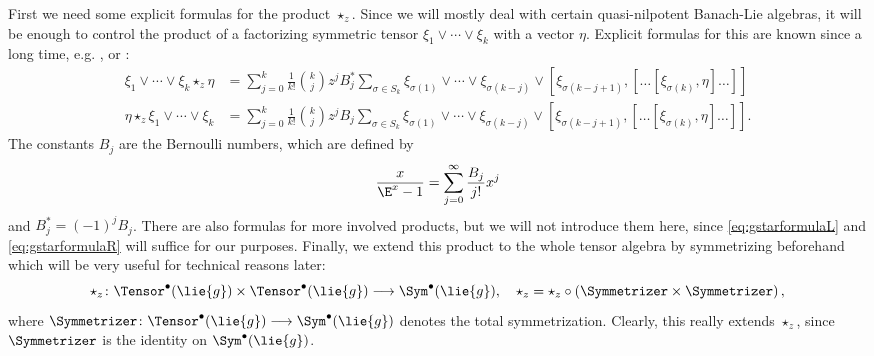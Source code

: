 \documentclass[
11pt,                          %
english                        %
]{article}
\begin{document}
First we need some explicit formulas for the product $\star_z$. Since we will 
mostly deal with certain quasi-nilpotent Banach-Lie algebras, it will be enough to 
control the product of a factorizing symmetric tensor $\xi_1 \vee \cdots \vee \xi_k$ 
with a vector $\eta$. Explicit formulas for this are known since a long time, e.g. 
\cite[Prop. 1]{gutt:1983a}, \cite[2.8.12 (c)]{dixmier:1977a} or \cite[Prop. 2.6]
{esposito.stapor.waldmann:2015a:pre}:
\begin{align}
    \label{eq:gstarformulaR}
    \xi_1 \vee \cdots \vee \xi_k \star_z \eta
    &=
    \sum\limits_{j=0}^k
    \frac{1}{k!} \binom{k}{j}
    z^j B_j^*
    \sum\limits_{\sigma \in S_k}
    \xi_{\sigma(1)} \vee \cdots \vee \xi_{\sigma(k - j)} \vee
    [\xi_{\sigma(k - j + 1)},
    [ \ldots [\xi_{\sigma(k)}, \eta] \ldots ]
    ]
    \\
    \label{eq:gstarformulaL}
    \eta \star_z \xi_1 \vee \cdots \vee \xi_k
    &=
    \sum\limits_{j=0}^k
    \frac{1}{k!} \binom{k}{j}
    z^j B_j
    \sum\limits_{\sigma \in S_k}
    \xi_{\sigma(1)} \vee \cdots \vee \xi_{\sigma(k - j)} \vee
    [\xi_{\sigma(k - j + 1)},
    [ \ldots [\xi_{\sigma(k)}, \eta] \ldots ]
    ]
    .    
\end{align}
The constants $B_j$ are the Bernoulli numbers, which are defined by
\begin{equation}
	\frac{x}{\E^x - 1}
	=
	\sum\limits_{j=0}^\infty
	\frac{B_j}{j!}
	x^j
\end{equation}
and $B_j^* = (-1)^j B_j$. There are also formulas for more involved products, but 
we will not introduce them here, since \eqref{eq:gstarformulaL} and 
\eqref{eq:gstarformulaR} will suffice for our purposes. Finally, we extend this 
product to the whole tensor algebra by symmetrizing beforehand which will be very 
useful for technical reasons later:
\begin{equation}
	\label{eq:extended-gstar}
	\star_z
	\colon
	\Tensor^{\bullet}(\lie{g})
	\times
	\Tensor^{\bullet}(\lie{g})
	\longrightarrow
	\Sym^{\bullet}(\lie{g})
	, \quad
	\star_z
	=
	\star_z
	\circ
	\left(
		\Symmetrizer \times \Symmetrizer
	\right),
\end{equation}
where $\Symmetrizer \colon \Tensor^{\bullet}(\lie{g}) \longrightarrow \Sym^{\bullet}
(\lie{g})$ denotes the total symmetrization. Clearly, this really extends $\star_z$, 
since $\Symmetrizer$ is the identity on $\Sym^{\bullet}(\lie{g})$. 
\end{document}
